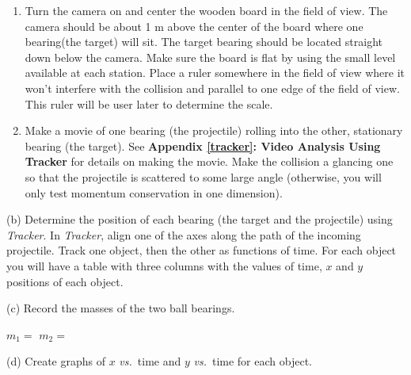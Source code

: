 \begin{enumerate}
\item Turn the camera on and center the wooden board in the field of view. The camera
should be about 1 m above the center of the board where one bearing(the target)
will sit. The target bearing should be located straight down below the camera.
 Make sure the board is flat by using the small level available at each station. 
 Place a ruler somewhere
in the field of view where it won't interfere with the collision and parallel
to one edge of the field of view. This ruler will be user later to determine
the scale. 
\item Make a movie of one bearing (the projectile) rolling into the other, stationary
bearing (the target). See \textbf{Appendix \ref{tracker}: Video Analysis Using Tracker} 
for details on making the movie. Make the collision a glancing one so that the 
projectile is scattered to some large angle (otherwise, you will only test 
momentum conservation in one dimension).
\end{enumerate}
(b) Determine the position of each bearing (the target and the projectile) 
using \textit{Tracker}. In \textit{Tracker}, align one of the axes along the 
path of the incoming projectile. Track one object, then the other as functions 
of time. For each object you will have a table with three columns with the 
values of time, $x$ and $y$ positions of each object.
\vspace{5mm}


(c) Record the masses of the two ball bearings.
\vspace{5mm}

\( m_{1} =\)  \hfill{}\( m_{2} =\)  \hfill{}
\vspace{5mm}

(d) Create graphs of $x$ \textit{vs.}~time and $y$ \textit{vs.}~time for each object.
\vspace{7mm}


